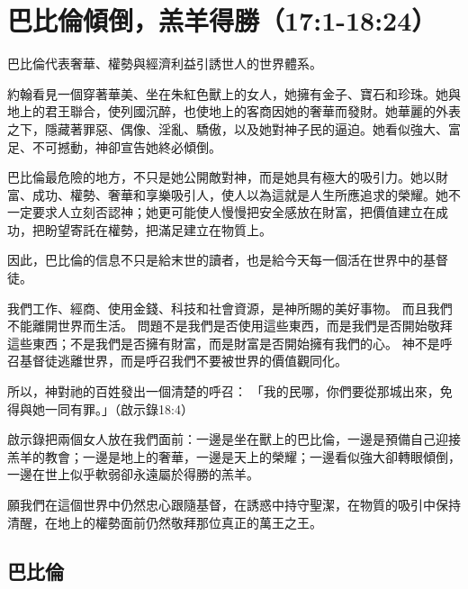 \chapter{巴比倫傾倒，羔羊得勝（17:1-18:24）}

巴比倫代表奢華、權勢與經濟利益引誘世人的世界體系。

約翰看見一個穿著華美、坐在朱紅色獸上的女人，她擁有金子、寶石和珍珠。她與地上的君王聯合，使列國沉醉，也使地上的客商因她的奢華而發財。她華麗的外表之下，隱藏著罪惡、偶像、淫亂、驕傲，以及她對神子民的逼迫。她看似強大、富足、不可撼動，神卻宣告她終必傾倒。

巴比倫最危險的地方，不只是她公開敵對神，而是她具有極大的吸引力。她以財富、成功、權勢、奢華和享樂吸引人，使人以為這就是人生所應追求的榮耀。她不一定要求人立刻否認神；她更可能使人慢慢把安全感放在財富，把價值建立在成功，把盼望寄託在權勢，把滿足建立在物質上。

因此，巴比倫的信息不只是給末世的讀者，也是給今天每一個活在世界中的基督徒。

我們工作、經商、使用金錢、科技和社會資源，是神所賜的美好事物。
而且我們不能離開世界而生活。
問題不是我們是否使用這些東西，而是我們是否開始敬拜這些東西；不是我們是否擁有財富，而是財富是否開始擁有我們的心。
神不是呼召基督徒逃離世界，而是呼召我們不要被世界的價值觀同化。

所以，神對祂的百姓發出一個清楚的呼召：
「我的民哪，你們要從那城出來，免得與她一同有罪。」（啟示錄18:4）

啟示錄把兩個女人放在我們面前：一邊是坐在獸上的巴比倫，一邊是預備自己迎接羔羊的教會；一邊是地上的奢華，一邊是天上的榮耀；一邊看似強大卻轉眼傾倒，一邊在世上似乎軟弱卻永遠屬於得勝的羔羊。

願我們在這個世界中仍然忠心跟隨基督，在誘惑中持守聖潔，在物質的吸引中保持清醒，在地上的權勢面前仍然敬拜那位真正的萬王之王。

\section{巴比倫}

